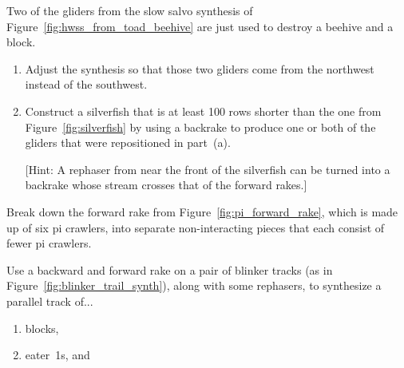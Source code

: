 \begin{multicols}{2}
	
	\mfilbreak
	
	
	\begin{problem}\label{exer:silverfish_backward_glider_destroy}
		Two of the gliders from the slow salvo synthesis of Figure~\ref{fig:hwss_from_toad_beehive} are just used to destroy a beehive and a block.\smallskip
		
		\begin{enumerate}[label=\bf\color{ocre}(\alph*)]
			\item {} Adjust the synthesis so that those two gliders come from the northwest instead of the southwest.
			
			\item {} Construct a silverfish that is at least 100 rows shorter than the one from Figure~\ref{fig:silverfish} by using a backrake to produce one or both of the gliders that were repositioned in part~(a).
			
			[Hint: A rephaser from near the front of the silverfish can be turned into a backrake whose stream crosses that of the forward rakes.]
		\end{enumerate}
	\end{problem}
	
	
	\mfilbreak
	
	
	\begin{problem}\label{exer:pi_forward_rake_break_apart} 
		Break down the forward rake from Figure~\ref{fig:pi_forward_rake}, which is made up of six pi crawlers, into separate non-interacting pieces that each consist of fewer pi crawlers.
	\end{problem}


	\mfilbreak
	
	
	\begin{problem}\label{exer:two_pi_tracks_synth_objects}
		Use a backward and forward rake on a pair of blinker tracks (as in Figure~\ref{fig:blinker_trail_synth}), along with some rephasers, to synthesize a parallel track of...\smallskip
		
		\begin{enumerate}[label=\bf\color{ocre}(\alph*)]
			\item {} blocks,
			
			\item {} eater~1s, and
			

\end{enumerate}
\end{problem}
\end{multicols}
